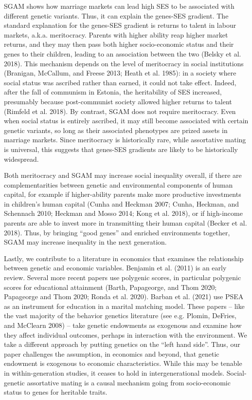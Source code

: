 \documentclass[
]{article}
\theoremstyle{definition}
\theoremstyle{definition}
\theoremstyle{definition}
\theoremstyle{definition}
\theoremstyle{remark}
\begin{document}
SGAM shows how marriage markets can lead high SES to be associated with different
genetic variants. Thus, it can explain the genes-SES gradient. The standard
explanation for the genes-SES gradient is returns to talent in labour markets, a.k.a.
meritocracy. Parents with higher ability reap higher market returns, and they
may then pass both higher socio-economic status and their genes to their
children, leading to an association between the two (Belsky et al. 2018). This
mechanism depends on the level of meritocracy in social institutions
(Branigan, McCallum, and Freese 2013; Heath et al. 1985): in a society where social status was
ascribed rather than earned, it could not take effect. Indeed, after the fall of
communism in Estonia, the heritability of SES increased, presumably because
post-communist society allowed higher returns to talent (Rimfeld et al. 2018). By
contrast, SGAM does not require meritocracy. Even when social status is entirely
ascribed, it may still become associated with certain genetic variants, so long
as their associated phenotypes are prized assets in marriage markets. Since
meritocracy is historically rare, while assortative mating is universal, this
suggests that genes-SES gradients are likely to be historically widespread.

Both meritocracy and SGAM may increase social inequality overall, if there are
complementarities between genetic and environmental components of human capital,
for example if higher-ability parents make more productive investments in
children's human capital (Cunha and Heckman 2007; Cunha, Heckman, and Schennach 2010; Heckman and Mosso 2014; Kong et al. 2018), or if high-income parents are able to
invest more in transmitting their human capital (Becker et al. 2018). Thus, by
bringing ``good genes'' and enriched environments together, SGAM may increase
inequality in the next generation.

Lastly, we contribute to a literature in economics that examines the
relationship between genetic and economic variables. Benjamin et al. (2011) is an
early review. Several more recent papers use polygenic scores, in particular
polygenic scores for educational attainment (Barth, Papageorge, and Thom 2020; Papageorge and Thom 2020; Ronda et al. 2020). Barban et al. (2021) use PSEA as an
instrument for education in a marital matching model. These papers --
like the vast majority of the behavior genetics literature (see e.g. Plomin, DeFries, and McClearn 2008) -- take genetic endowments as exogenous and examine how
they affect individual outcomes, perhaps in interaction with the environment. We
take a different approach by putting genetics on the ``left hand side''. Thus, our
paper challenges the assumption, in economics and beyond, that genetic endowment
is exogenous to economic characteristics. While this may be tenable in
within-generation studies, it ceases to hold in intergenerational models.
Social-genetic assortative mating is a causal mechanism going from
socio-economic status to genes for heritable traits.
\end{document}

